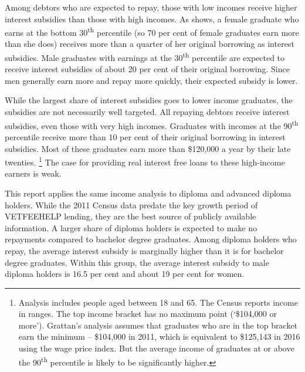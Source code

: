 \documentclass[embargoed]{grattan}
\begin{document}
Among debtors who are expected to repay, those with low incomes receive higher interest subsidies than those with high incomes.
As  shows, a female graduate who earns at the bottom 30\textsuperscript{th} percentile (so 70 per cent of female graduates earn more than she does) receives more than a quarter of her original borrowing as interest subsidies.
Male graduates with earnings at the 30\textsuperscript{th} percentile are expected to receive interest subsidies of about 20 per cent of their original borrowing.
Since men generally earn more and repay more quickly, their expected subsidy is lower.

While the largest share of interest subsidies goes to lower income graduates, the subsidies are not necessarily well targeted.
All repaying debtors receive interest subsidies, even those with very high incomes.
Graduates with incomes at the 90\textsuperscript{th} percentile receive more than 10 per cent of their original borrowing in interest subsidies.
Most of these graduates earn more than \$120,000 a year by their late twenties.%
\footnote{Analysis includes people aged between 18 and 65.
The Census reports income in ranges.
The top income bracket has no maximum point (`\$104,000 or more').
Grattan's analysis assumes that graduates who are in the top bracket earn the minimum -- \$104,000 in 2011, which is equivalent to \$125,143 in 2016 using the wage price index.
But the average income of graduates at or above the 90\textsuperscript{th} percentile is likely to be significantly higher.} The case for providing real interest free loans to these high-income earners is weak.

\protect\hypertarget{_Ref312571851}{}{}This report applies the same income analysis to diploma and advanced diploma holders.
While the 2011 Census data predate the key growth period of \gls{VETFEEHELP} lending, they are the best source of publicly available information.
A larger share of diploma holders is expected to make no repayments compared to bachelor degree graduates.
Among diploma holders who repay, the average interest subsidy is marginally higher than it is for bachelor degree graduates.
Within this group, the average interest subsidy to male diploma holders is 16.5 per cent and about 19 per cent for women.
\end{document}
